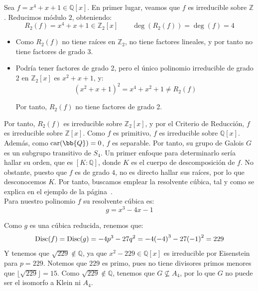 \begin{ejemplo}\label{ejemplo:resolvente_cubica2}
    Sea $f=x^4+x+1\in \mathbb{Q}[x]$. En primer lugar, veamos que $f$ es irreducible sobre $\mathbb{Z}$. Reducimos módulo $2$, obteniendo:
    \begin{equation*}
        R_2(f) = x^4+x+1 \in \mathbb{Z}_2[x]\qquad \deg(R_2(f)) = \deg(f) = 4
    \end{equation*}
    \begin{itemize}
        \item Como $R_2(f)$ no tiene raíces en $\mathbb{Z}_2$, no tiene factores lineales, y por tanto no tiene factores de grado 3.
        \item Podría tener factores de grado 2, pero el único polinomio irreducible de grado 2 en $\mathbb{Z}_2[x]$ es $x^2+x+1$, y:
        \begin{equation*}
            (x^2+x+1)^2 = x^4 + x^2 + 1 \neq R_2(f)
        \end{equation*}

        Por tanto, $R_2(f)$ no tiene factores de grado 2.
    \end{itemize}

    Por tanto, $R_2(f)$ es irreducible sobre $\mathbb{Z}_2[x]$, y por el Criterio de Reducción, $f$ es irreducible sobre $\mathbb{Z}[x]$. Como $f$ es primitivo, $f$ es irreducible sobre $\mathbb{Q}[x]$. Además, como $\car(\bb{Q}) = 0$, $f$ es separable. Por tanto, su grupo de Galois $G$ es un subgrupo transitivo de $S_4$. Un primer enfoque para determinarlo sería hallar su orden, que es $[K:\mathbb{Q}]$, donde $K$ es el cuerpo de descomposición de $f$. No obstante, puesto que $f$ es de grado $4$, no es directo hallar sus raíces, por lo que desconocemos $K$. Por tanto, buscamos emplear la resolvente cúbica, tal y como se explica en el ejemplo de la página~\pageref{ejemplo:resolvente_cubica}.\\

    Para nuestro polinomio $f$ su resolvente cúbica es: 
    \begin{equation*}
        g = x^3-4x -1
    \end{equation*}

    Como $g$ es una cúbica reducida, renemos que:
    \begin{equation*}
        \operatorname{Disc}(f) = \operatorname{Disc}(g) = -4p^3 - 27q^2 = -4{(-4)}^{3} - 27{(-1)}^{2} = 229
    \end{equation*}
    Y tenemos que $\sqrt{229}\notin \mathbb{Q}$, ya que $x^2-229\in \mathbb{Q}[x]$ es irreducible por Eisenstein para $p=229$. Notemos que $229$ es primo, pues no tiene divisores primos menores que $\lfloor {\sqrt{229}}\rfloor = 15$. Como $\sqrt{229}\notin \mathbb{Q}$, tenemos que $G\not\subseteq A_4$, por lo que $G$ no puede ser el isomorfo a Klein ni $A_4$.\\


\end{ejemplo}
